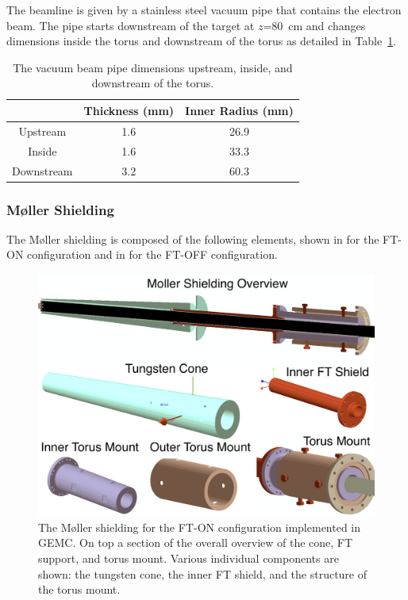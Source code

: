 The beamline is given by a stainless steel vacuum pipe that contains the electron beam. The pipe starts downstream of
the target at $z$=80~cm and changes dimensions inside the torus and downstream of the torus as detailed in
Table~\ref{tab:beampipe}.

\begin{table}[h]
	\begin{center}
		\begin{tabular}{| c | c | c |}
			\hline \hline
			                & Thickness (mm) & Inner Radius (mm)   \\
			\hline
              Upstream      &    1.6     &    26.9 \\
              Inside        &    1.6     &    33.3 \\
            Downstream      &    3.2     &    60.3 \\
			\hline \hline
		\end{tabular}
	\end{center}
	\caption{The vacuum beam pipe dimensions upstream, inside, and downstream of the torus.}
        \label{tab:beampipe}
\end{table}

\subsubsection{M\o ller Shielding}

The M\o ller shielding is composed of the following elements, shown in  for the FT-ON
configuration and in  for the FT-OFF configuration.

\begin{figure}
	\centering
	\includegraphics[width=0.99\columnwidth,keepaspectratio]{img/moellerShieldingFTOn.png}
	\caption{The M\o ller shielding for the FT-ON configuration implemented in GEMC. On top a section of the overall
          overview of the cone, FT support, and torus mount. Various individual components are shown: the tungsten cone, the
          inner FT shield, and the structure of the torus mount.}
	\label{fig:moellerShieldingFTOn}
\end{figure}

